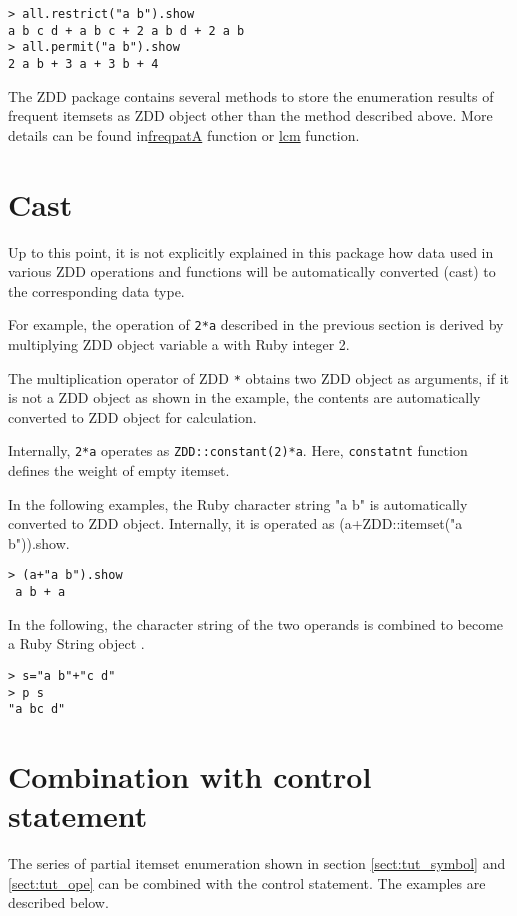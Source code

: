 \begin{Verbatim}[baselinestretch=0.7,frame=single]
> all.restrict("a b").show
a b c d + a b c + 2 a b d + 2 a b 
> all.permit("a b").show
2 a b + 3 a + 3 b + 4  
\end{Verbatim}

The ZDD package contains several methods to store the enumeration results of frequent itemsets as ZDD object other than the method described above. More details can be found in\hyperref[sect:freqpatA]{freqpatA} function or \hyperref[sect:lcm]{lcm} function.

\section{Cast}

Up to this point, it is not explicitly explained in this package how data used in various ZDD operations and functions will be automatically converted (cast) to the corresponding data type. 

For example, the operation of \verb|2*a| described in the previous section is derived by multiplying ZDD object variable a with Ruby integer 2. 

The multiplication operator of ZDD \verb|*| obtains two ZDD object as arguments, if it is not a ZDD object as shown in the example, the contents are automatically converted to ZDD object for calculation. 

Internally, \verb|2*a| operates as \verb|ZDD::constant(2)*a|. Here, \verb|constatnt| function defines the weight of empty itemset.

In the following examples, the Ruby character string "a b" is automatically converted to ZDD object. Internally, it is operated as (a+ZDD::itemset("a b")).show.

\begin{Verbatim}[baselinestretch=0.7,frame=single]
> (a+"a b").show
 a b + a
\end{Verbatim}

In the following, the character string of the two operands is combined to become a Ruby String object .

\begin{Verbatim}[baselinestretch=0.7,frame=single]
> s="a b"+"c d"
> p s
"a bc d"
\end{Verbatim}

\section{Combination with control statement}
The series of partial itemset enumeration shown in  section \ref{sect:tut_symbol} and \ref{sect:tut_ope} can be combined with the control statement. The examples are described below.

